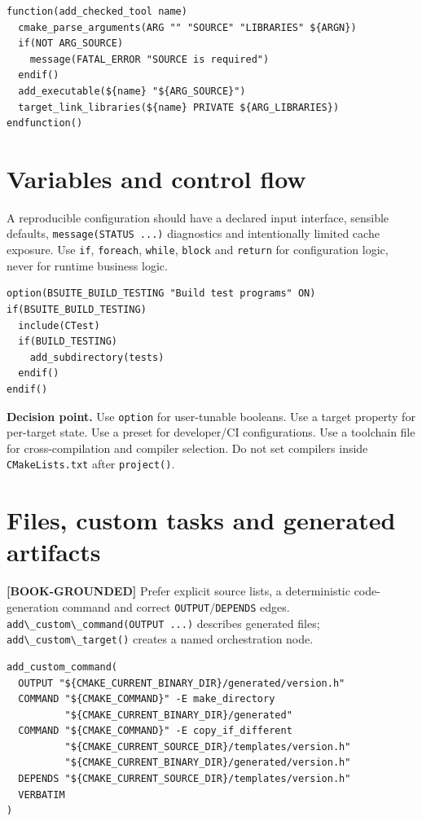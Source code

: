 \documentclass[11pt,letterpaper,oneside]{report}
\providecommand{\passthrough}[1]{#1}
\begin{document}
\begin{lstlisting}
function(add_checked_tool name)
  cmake_parse_arguments(ARG "" "SOURCE" "LIBRARIES" ${ARGN})
  if(NOT ARG_SOURCE)
    message(FATAL_ERROR "SOURCE is required")
  endif()
  add_executable(${name} "${ARG_SOURCE}")
  target_link_libraries(${name} PRIVATE ${ARG_LIBRARIES})
endfunction()
\end{lstlisting}

\chapter{Variables and control flow}\label{variables-and-control-flow}

A reproducible configuration should have a declared input interface,
sensible defaults, \passthrough{\lstinline!message(STATUS ...)!}
diagnostics and intentionally limited cache exposure. Use
\passthrough{\lstinline!if!}, \passthrough{\lstinline!foreach!},
\passthrough{\lstinline!while!}, \passthrough{\lstinline!block!} and
\passthrough{\lstinline!return!} for configuration logic, never for
runtime business logic.

\begin{lstlisting}
option(BSUITE_BUILD_TESTING "Build test programs" ON)
if(BSUITE_BUILD_TESTING)
  include(CTest)
  if(BUILD_TESTING)
    add_subdirectory(tests)
  endif()
endif()
\end{lstlisting}

\textbf{Decision point.} Use \passthrough{\lstinline!option!} for
user-tunable booleans. Use a target property for per-target state. Use a
preset for developer/CI configurations. Use a toolchain file for
cross-compilation and compiler selection. Do not set compilers inside
\passthrough{\lstinline!CMakeLists.txt!} after
\passthrough{\lstinline!project()!}.

\chapter{Files, custom tasks and generated
artifacts}\label{files-custom-tasks-and-generated-artifacts}

\textbf{{[}BOOK-GROUNDED{]}} Prefer explicit source lists, a
deterministic code-generation command and correct
\passthrough{\lstinline!OUTPUT!}/\passthrough{\lstinline!DEPENDS!}
edges. \passthrough{\lstinline!add\_custom\_command(OUTPUT ...)!}
describes generated files;
\passthrough{\lstinline!add\_custom\_target()!} creates a named
orchestration node.

\begin{lstlisting}
add_custom_command(
  OUTPUT "${CMAKE_CURRENT_BINARY_DIR}/generated/version.h"
  COMMAND "${CMAKE_COMMAND}" -E make_directory
          "${CMAKE_CURRENT_BINARY_DIR}/generated"
  COMMAND "${CMAKE_COMMAND}" -E copy_if_different
          "${CMAKE_CURRENT_SOURCE_DIR}/templates/version.h"
          "${CMAKE_CURRENT_BINARY_DIR}/generated/version.h"
  DEPENDS "${CMAKE_CURRENT_SOURCE_DIR}/templates/version.h"
  VERBATIM
)
\end{lstlisting}
\end{document}
